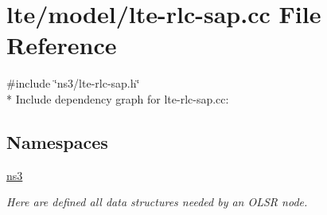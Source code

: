 \hypertarget{lte-rlc-sap_8cc}{}\section{lte/model/lte-\/rlc-\/sap.cc File Reference}
\label{lte-rlc-sap_8cc}
{\ttfamily \#include \char`\"{}ns3/lte-\/rlc-\/sap.\+h\char`\"{}}\\*
Include dependency graph for lte-\/rlc-\/sap.cc\+:
\subsection*{Namespaces}
\begin{DoxyCompactItemize}
\item 
 \hyperlink{namespacens3}{ns3}
\begin{DoxyCompactList}\small\item\em Here are defined all data structures needed by an O\+L\+SR node. \end{DoxyCompactList}\end{DoxyCompactItemize}
